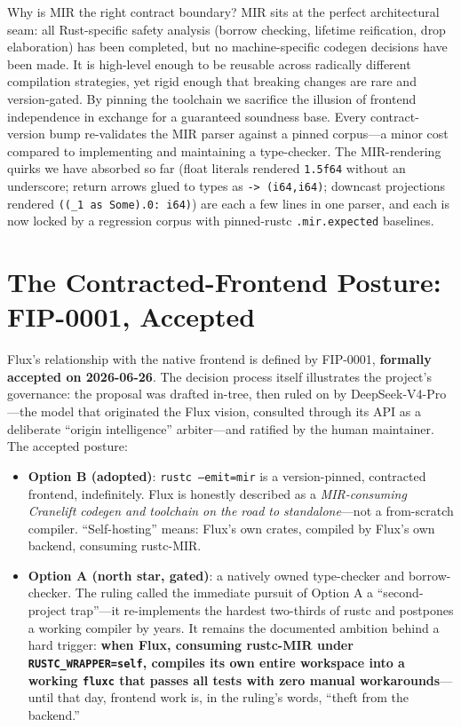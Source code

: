 Why is MIR the right contract boundary? MIR sits at the perfect architectural seam: all Rust-specific safety analysis (borrow checking, lifetime reification, drop elaboration) has been completed, but no machine-specific codegen decisions have been made. It is high-level enough to be reusable across radically different compilation strategies, yet rigid enough that breaking changes are rare and version-gated. By pinning the toolchain we sacrifice the illusion of frontend independence in exchange for a guaranteed soundness base. Every contract-version bump re-validates the MIR parser against a pinned corpus---a minor cost compared to implementing and maintaining a type-checker. The MIR-rendering quirks we have absorbed so far (float literals rendered \texttt{1.5f64} without an underscore; return arrows glued to types as \texttt{->\ (i64,i64)}; downcast projections rendered \texttt{((\_1 as Some).0: i64)}) are each a few lines in one parser, and each is now locked by a regression corpus with pinned-rustc \texttt{.mir.expected} baselines.


\section{The Contracted-Frontend Posture: FIP-0001, Accepted}

Flux's relationship with the native frontend is defined by FIP-0001, \textbf{formally accepted on 2026-06-26}. The decision process itself illustrates the project's governance: the proposal was drafted in-tree, then ruled on by DeepSeek-V4-Pro---the model that originated the Flux vision, consulted through its API as a deliberate ``origin intelligence'' arbiter---and ratified by the human maintainer. The accepted posture:

\begin{itemize}
\item \textbf{Option B (adopted)}: \texttt{rustc --emit=mir} is a version-pinned, contracted frontend, indefinitely. Flux is honestly described as a \emph{MIR-consuming Cranelift codegen and toolchain on the road to standalone}---not a from-scratch compiler. ``Self-hosting'' means: Flux's own crates, compiled by Flux's own backend, consuming rustc-MIR.
\item \textbf{Option A (north star, gated)}: a natively owned type-checker and borrow-checker. The ruling called the immediate pursuit of Option A a ``second-project trap''---it re-implements the hardest two-thirds of rustc and postpones a working compiler by years. It remains the documented ambition behind a hard trigger: \textbf{when Flux, consuming rustc-MIR under \texttt{RUSTC\_WRAPPER=self}, compiles its own entire workspace into a working \texttt{fluxc} that passes all tests with zero manual workarounds}---until that day, frontend work is, in the ruling's words, ``theft from the backend.''
\end{itemize}

